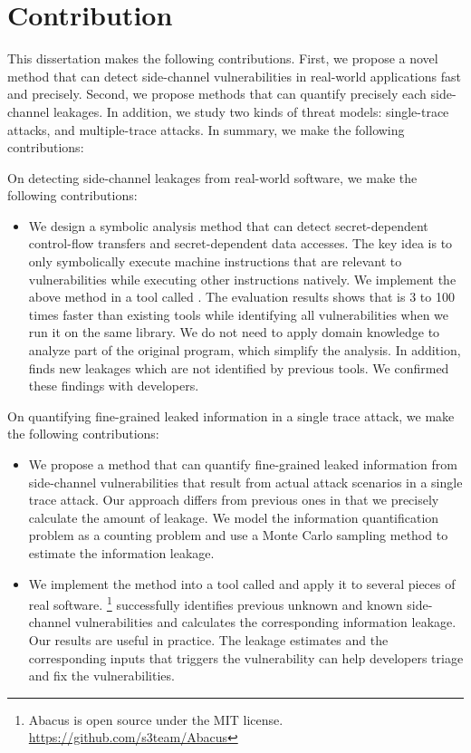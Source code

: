 \section{Contribution}
This dissertation makes the following contributions. First, we propose a novel method that can detect side-channel vulnerabilities in real-world applications fast and precisely. Second, we propose methods that can quantify precisely each side-channel leakages. In addition, we study two kinds of threat models: single-trace attacks, and multiple-trace attacks. In summary, we make the following contributions:

On detecting side-channel leakages from real-world software, we make the following contributions:

\begin{itemize}
    \item We design a symbolic analysis method that can detect secret-dependent control-flow transfers and secret-dependent data accesses. The key idea is to only symbolically execute machine instructions that are relevant to vulnerabilities while executing other instructions natively. We implement the above method in a tool called \detect{}. The evaluation results shows that \detect{} is 3 to 100 times faster than existing tools while identifying all vulnerabilities when we run it on the same library.  We do not need to apply domain knowledge to analyze part of the original program, which simplify the analysis. In addition, \detect{} finds new leakages which are not identified by previous tools. We confirmed these findings with developers.
\end{itemize}

On quantifying fine-grained leaked information in a single trace attack, we make the following contributions:


\begin{itemize}
    \item We propose a method that can quantify fine-grained leaked information from side-channel vulnerabilities that result from actual attack scenarios in a single trace attack. Our approach differs from previous ones in that we precisely calculate the amount of leakage. We model the information quantification problem as a counting problem and use a Monte Carlo sampling method to estimate the information leakage.
    \item We implement the method into a tool called \tool{} and apply it to several pieces of real software. \tool{}\footnote{Abacus is open source under the MIT license.  \url{https://github.com/s3team/Abacus}} successfully identifies previous unknown and known side-channel vulnerabilities and calculates the corresponding information leakage. Our results are useful in practice. The leakage estimates and the corresponding inputs that triggers the vulnerability can help developers triage and fix the vulnerabilities.
\end{itemize}

